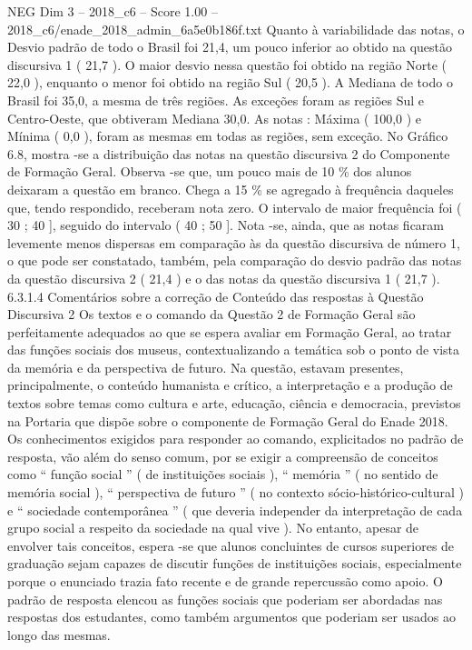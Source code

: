 \begin{textsample}{NEG Dim 3 – 2018\_c6 – Score 1.00 – 2018\_c6/enade\_2018\_admin\_6a5e0b186f.txt}
Quanto à variabilidade das notas, o Desvio padrão de todo o Brasil foi 21,4, um pouco inferior ao obtido na questão discursiva 1 ( 21,7 ).
O maior desvio nessa questão foi obtido na região Norte ( 22,0 ), enquanto o menor foi obtido na região Sul ( 20,5 ).
A Mediana de todo o Brasil foi 35,0, a mesma de três regiões.
As exceções foram as regiões Sul e Centro-Oeste, que obtiveram Mediana 30,0.
As notas : Máxima ( 100,0 ) e Mínima ( 0,0 ), foram as mesmas em todas as regiões, sem exceção.
No Gráfico 6.8, mostra -se a distribuição das notas na questão discursiva 2 do Componente de Formação Geral.
Observa -se que, um pouco mais de 10 \% dos alunos deixaram a questão em branco.
Chega a 15 \% se agregado à frequência daqueles que, tendo respondido, receberam nota zero.
O intervalo de maior frequência foi ( 30 ; 40 ], seguido do intervalo ( 40 ; 50 ].
Nota -se, ainda, que as notas ficaram levemente menos dispersas em comparação às da questão discursiva de número 1, o que pode ser constatado, também, pela comparação do desvio padrão das notas da questão discursiva 2 ( 21,4 ) e o das notas da questão discursiva 1 ( 21,7 ). 6.3.1.4 Comentários sobre a correção de Conteúdo das respostas à Questão Discursiva 2 Os textos e o comando da Questão 2 de Formação Geral são perfeitamente adequados ao que se espera avaliar em Formação Geral, ao tratar das funções sociais dos museus, contextualizando a temática sob o ponto de vista da memória e da perspectiva de futuro.
Na questão, estavam presentes, principalmente, o conteúdo humanista e crítico, a interpretação e a produção de textos sobre temas como cultura e arte, educação, ciência e democracia, previstos na Portaria que dispõe sobre o componente de Formação Geral do Enade 2018.
Os conhecimentos exigidos para responder ao comando, explicitados no padrão de resposta, vão além do senso comum, por se exigir a compreensão de conceitos como “ função social ” ( de instituições sociais ), “ memória ” ( no sentido de memória social ), “ perspectiva de futuro ” ( no contexto sócio-histórico-cultural ) e “ sociedade contemporânea ” ( que deveria independer da interpretação de cada grupo social a respeito da sociedade na qual vive ).
No entanto, apesar de envolver tais conceitos, espera -se que alunos concluintes de cursos superiores de graduação sejam capazes de discutir funções de instituições sociais, especialmente porque o enunciado trazia fato recente e de grande repercussão como apoio.
O padrão de resposta elencou as funções sociais que poderiam ser abordadas nas respostas dos estudantes, como também argumentos que poderiam ser usados ao longo das mesmas.

\end{textsample}
